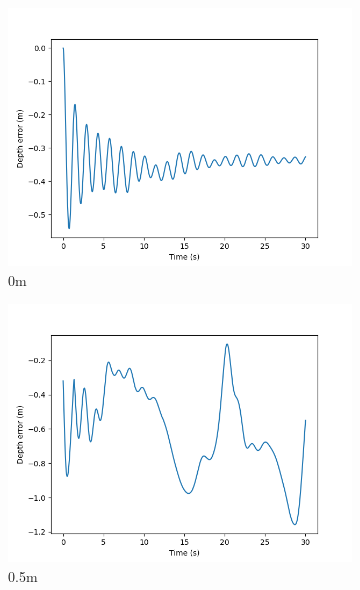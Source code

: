\documentclass[class=article, crop=false]{standalone}
\begin{document}
\begin{figure}
    \centering
    \begin{subfigure}[b]{0.48\textwidth}
        \centering
        \includegraphics{scenario1/rov-100m/0.0m/rov_depth_error_controlled}
        \caption{0m}
        \label{}
    \end{subfigure}
    \hfill
    \begin{subfigure}[b]{0.48\textwidth}
        \centering
        \includegraphics{scenario1/rov-100m/0.5m/rov_depth_error_controlled}
        \caption{0.5m}
        \label{}
    \end{subfigure}
    \vfill
    \begin{subfigure}[b]{0.48\textwidth}
        \centering

\end{subfigure}
\end{figure}
\end{document}
